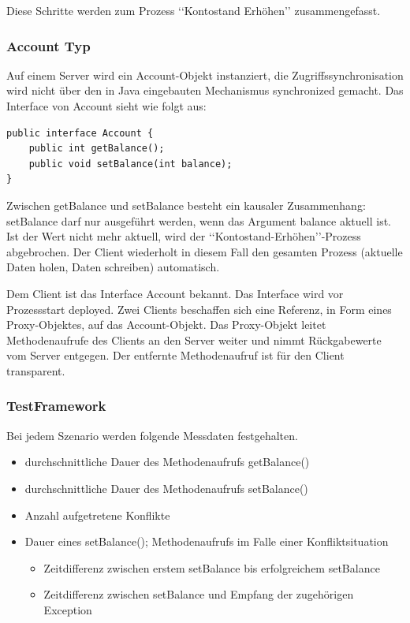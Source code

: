 \documentclass{article}
\begin{document}
\noindent Diese Schritte werden zum Prozess ‘‘Kontostand Erhöhen’’ zusammengefasst.

\subsubsection{Account Typ}
\label{sec:account-typ}

Auf einem Server wird ein Account-Objekt instanziert, die Zugriffssynchronisation wird nicht über den in Java eingebauten Mechanismus synchronized gemacht. Das Interface von Account sieht wie folgt aus:
\begin{lstlisting}
public interface Account {
    public int getBalance();
    public void setBalance(int balance);    
}
\end{lstlisting}
Zwischen getBalance und setBalance besteht ein kausaler Zusammenhang: setBalance darf nur ausgeführt werden, wenn das Argument balance aktuell ist. Ist der Wert nicht mehr aktuell, wird der ‘‘Kontostand-Erhöhen’’-Prozess abgebrochen. Der Client wiederholt in diesem Fall den gesamten Prozess (aktuelle Daten holen, Daten schreiben) automatisch.

Dem Client ist das Interface Account bekannt. Das Interface wird vor Prozessstart deployed.
Zwei Clients beschaffen sich eine Referenz, in Form eines
Proxy-Objektes, auf das Account-Objekt. Das Proxy-Objekt leitet
Methodenaufrufe des Clients an den Server weiter und nimmt
Rückgabewerte vom Server entgegen. Der entfernte Methodenaufruf ist
für den Client transparent.

\subsubsection{TestFramework}
\label{sec:testframework-1}


Bei jedem Szenario werden folgende Messdaten festgehalten.
\begin{itemize}
\item durchschnittliche Dauer des Methodenaufrufs getBalance()
\item durchschnittliche Dauer des Methodenaufrufs setBalance()
\item Anzahl aufgetretene Konflikte
\item Dauer eines setBalance(); Methodenaufrufs im Falle einer Konfliktsituation
  \begin{itemize}
  \item Zeitdifferenz zwischen erstem setBalance bis erfolgreichem setBalance
  \item Zeitdifferenz zwischen setBalance und Empfang der zugehörigen Exception
  \end{itemize}
\end{itemize}
\end{document}
